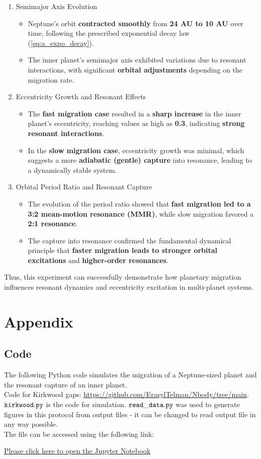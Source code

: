 \documentclass[12pt,a4paper]{article}
\begin{document}
\begin{enumerate}
  \item Semimajor Axis Evolution
  \begin{itemize}
    \item Neptune’s orbit \textbf{contracted smoothly} from \textbf{24 AU to 10 AU} over time, following the prescribed exponential decay law (\ref{eq:a_expo_decay}).
    \item The inner planet's semimajor axis exhibited variations due to resonant interactions, with significant \textbf{orbital adjustments} depending on the migration rate.
  \end{itemize}
  \item Eccentricity Growth and Resonant Effects
  \begin{itemize}
    \item The \textbf{fast migration case} resulted in a \textbf{sharp increase} in the inner planet’s eccentricity, reaching values as high as \textbf{0.3}, indicating \textbf{strong resonant interactions}.
    \item In the \textbf{slow migration case}, eccentricity growth was minimal, which suggests a more \textbf{adiabatic (gentle) capture} into resonance, leading to a dynamically stable system.
  \end{itemize}
  \item Orbital Period Ratio and Resonant Capture
  \begin{itemize}
    \item The evolution of the period ratio showed that \textbf{fast migration led to a 3:2 mean-motion resonance (MMR)}, while slow migration favored a \textbf{2:1 resonance}.
    \item The capture into resonance confirmed the fundamental dynamical principle that \textbf{faster migration leads to stronger orbital excitations} and \textbf{higher-order resonances}.
  \end{itemize}
\end{enumerate}

\noindent Thus, this experiment can successfully demonstrate how planetary migration influences resonant dynamics and eccentricity excitation in multi-planet systems.

\setcounter{secnumdepth}{0}

\printbibliography     
\appendix
\section{Appendix}
\subsection{Code}
\label{sec:code}
The following Python code simulates the migration of a Neptune-sized planet and the resonant capture of an inner planet. 
\\Code for Kirkwood gaps: \url{https://github.com/ErasylTelman/Nbody/tree/main}. $\tt kirkwood.py$ is the code for simulation. 
$\tt read\_data.py$ was used to generate figures in this protocol from output files - it can be changed to read output file in any way possible.
\\ The file can be accessed using the following link:

\href{https://github.com/PratyushSingh09/Astro-Lab/blob/main/N%20Body/Resonant-Capture.ipynb}{Please click here to open the Jupyter Notebook}
\end{document}
